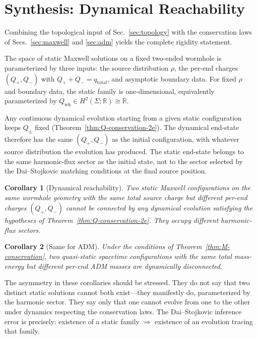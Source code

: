 \documentclass[aps,prd,onecolumn,nofootinbib,superscriptaddress]{revtex4-2}
\newtheorem{corollary}{Corollary}
\begin{document}
\section{Synthesis: Dynamical Reachability}
\label{sec:synthesis}

Combining the topological input of Sec.~\ref{sec:topology} with the
conservation laws of Secs.~\ref{sec:maxwell} and \ref{sec:adm} yields the
complete rigidity statement.

The space of static Maxwell solutions on a fixed two-ended wormhole is
parameterized by three inputs: the source distribution $\rho$, the per-end
charges $(Q_+,Q_-)$ with $Q_++Q_-=q_{\mathrm{total}}$, and asymptotic boundary
data.  For fixed $\rho$ and boundary data, the static family is
one-dimensional, equivalently parameterized by $Q_{\mathrm{wh}}\in H^2(\Sigma;\mathbb{R})\cong\mathbb{R}$.

Any continuous dynamical evolution starting from a given static configuration
keeps $Q_\pm$ fixed (Theorem~\ref{thm:Q-conservation-2e}).  The dynamical
end-state therefore has the same $(Q_+,Q_-)$ as the initial configuration,
with whatever source distribution the evolution has produced.  The static
end-state belongs to the same harmonic-flux sector as the initial state, not
to the sector selected by the Dai--Stojkovic matching conditions at the final
source position.

\begin{corollary}[Dynamical reachability]
\label{cor:reachability}
Two static Maxwell configurations on the same wormhole geometry with the same
total source charge but different per-end charges $(Q_+,Q_-)$ cannot be
connected by any dynamical evolution satisfying the hypotheses of
Theorem~\ref{thm:Q-conservation-2e}.  They occupy different harmonic-flux
sectors.
\end{corollary}

\begin{corollary}[Same for ADM]
\label{cor:reachability-adm}
Under the conditions of Theorem~\ref{thm:M-conservation}, two quasi-static
spacetime configurations with the same total mass-energy but different per-end
ADM masses are dynamically disconnected.
\end{corollary}

The asymmetry in these corollaries should be stressed.  They do not say that
two distinct static solutions cannot both exist---they manifestly do, parameterized
by the harmonic sector.  They say only that one cannot evolve from one to the
other under dynamics respecting the conservation laws.  The Dai--Stojkovic
inference error is precisely: existence of a static family $\Rightarrow$
existence of an evolution tracing that family.
\end{document}
